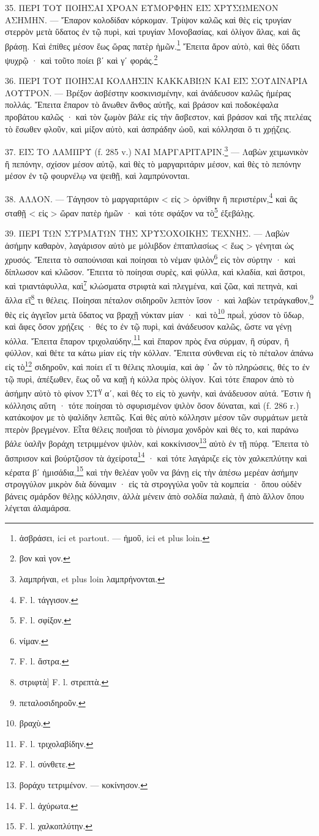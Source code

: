 \documentclass[a4paper, 11pt, oneside, polutonikogreek, french]{article}
\begin{document}
35. ΠΕΡΙ ΤΟΥ ΠΟΙΗΣΑΙ ΧΡΟΑΝ ΕΥΜΟΡΦΗΝ ΕΙΣ ΧΡΥΣΩΜΕΝΟΝ ΑΣΗΜΗΝ. --- Ἔπαρον κολοδίδαν κόρκομαν. Τρίψον καλῶς καὶ θὲς εἰς τρυγίαν στερρὸν μετὰ ὕδατος ἐν τῷ πυρὶ, καὶ τρυγίαν Μονοβασίας, καὶ ὀλίγον ἅλας, καὶ ἂς βράσῃ. Καὶ ἐπίθες μέσον ἕως ὥρας πατὲρ ἡμῶν.\footnote{ἀσβράσει, ici et partout. --- ἠμοῦ, ici et plus loin.} Ἔπειτα ἄρον αὐτὸ, καὶ θὲς ὕδατι ψυχρῷ · καὶ τοῦτο ποίει βʹ καὶ γʹ φοράς.\footnote{βον καὶ γον.}

36. ΠΕΡΙ ΤΟΥ ΠΟΙΗΣΑΙ ΚΟΛΛΗΣΙΝ ΚΑΚΚΑΒΙΩΝ ΚΑΙ ΕΙΣ ΣΟΥΛΙΝΑΡΙΑ ΛΟΥΤΡΟΝ. --- Βρέξον ἀσβέστην κοσκινισμένην, καὶ ἀνάδευσον καλῶς ἡμέρας πολλάς. Ἔπειτα ἔπαρον τὸ ἄνωθεν ἄνθος αὐτῆς, καὶ βράσον καὶ ποδοκέφαλα προβάτου καλῶς · καὶ τὸν ζωμὸν βάλε εἰς τὴν ἄσβεστον, καὶ βράσον καὶ τῆς πτελέας τὸ ἔσωθεν φλοῦν, καὶ μίξον αὐτὸ, καὶ ἀσπράδην ὠοῦ, καὶ κόλλησαι ὅ τι χρῄζεις.

37. ΕΙΣ ΤΟ ΛΑΜΠΡΥ (f. 285 v.) ΝΑΙ ΜΑΡΓΑΡΙΤΑΡΙΝ.\footnote{λαμπρήναι, et plus loin λαμπρήνονται.} --- Λαβὼν χειμωνικὸν ἢ πεπόνην, σχίσον μέσον αὐτῷ, καὶ θὲς τὸ μαργαριτάριν μέσον, καὶ θὲς τὸ πεπόνην μέσον ἐν τῷ φουρνέλῳ να ψειθῇ, καὶ λαμπρύνονται.

38. ΑΛΛΟΝ. --- Τάγησον τὸ μαργαριτάριν < εἰς > ὀρνίθην ἢ περιστέριν,\footnote{F. l. τάγγισον.} καὶ ἂς σταθῇ < εἰς > ὥραν πατὲρ ἡμῶν · καὶ τότε σφάξον να τὸ\footnote{F. l. σφίξον.} ἐξεβάλῃς.

39. ΠΕΡΙ ΤΩΝ ΣΥΡΜΑΤΩΝ ΤΗΣ ΧΡΥΣΟΧΟΙΚΗΣ ΤΕΧΝΗΣ. --- Λαβὼν ἀσήμην καθαρὸν, λαγάρισον αὐτὸ με μόλιβδον ἐπταπλασίως < ἕως > γένηται ὠς χρυσός. Ἔπειτα τὸ σαπούνισαι καὶ ποίησαι τὸ νέμαν ψιλὸν\footnote{νίμαν.} εἰς τὸν σύρτην · καὶ δίπλωσον καὶ κλῶσον. Ἔπειτα τὸ ποίησαι συρὲς, καὶ φύλλα, καὶ κλαδία, καὶ ἄστροι, καὶ τριαντάφυλλα, καὶ\footnote{F. l. ἄστρα.} κλώσματα στριφτὰ καὶ πλεγμένα, καὶ ζῶα, καὶ πετηνὰ, καὶ ἄλλα εἴ\footnote{στριφτὰ] F. l. στρεπτὰ.} τι θέλεις. Ποίησαι πέταλον σιδηροῦν λεπτὸν ἵσον · καὶ λαβὼν τετράγκαθον,\footnote{πεταλοσιδηροῦν.} θὲς εἰς ἀγγεῖον μετὰ ὕδατος να βραχῇ νύκταν μίαν · καὶ τὸ\footnote{βραχὺ.} πρωῒ, χύσον τὸ ὕδωρ, καὶ ἄφες ὅσον χρῄζεις · θές το ἐν τῷ πυρὶ, καὶ ἀνάδευσον καλῶς, ὥστε να γένῃ κόλλα. Ἔπειτα ἔπαρον τριχολαύδην,\footnote{F. l. τριχολαβίδην.} καὶ ἔπαρον πρὸς ἕνα σύρμαν, ἢ σύραν, ἢ φύλλον, καὶ θέτε τα κάτω μίαν εἰς τὴν κόλλαν. Ἔπειτα σύνθεναι εἰς τὸ πέταλον ἀπάνω εἰς τὸ\footnote{F. l. σύνθετε.} σιδηροῦν, καὶ ποίει εἴ τι θέλεις πλουμία, καὶ ἀφ ᾽ ὧν τὸ πληρώσεις, θές το ἐν τῷ πυρὶ, ἀπέξωθεν, ἕως οὗ να καῇ ἡ κόλλα πρὸς ὀλίγον. Καὶ τότε ἔπαρον ἀπὸ τὸ ἀσήμην αὐτὸ τὸ φίνον ΣΤ\textsuperscript{γ} αʹ, καὶ θές το εἰς τὸ χωνὴν, καὶ ἀνάδευσον αὐτά. Ἔστιν ἡ κόλλησις αὕτη · τότε ποίησαι τὸ σφυρισμένον ψιλὸν ὅσον δύναται, καὶ (f. 286 r.) κατάκοψον με τὸ ψαλίδην λεπτῶς. Καὶ θὲς αὐτὸ κόλλησιν μέσον τῶν συρμάτων μετὰ πτερὸν βρεγμένον. Εἶτα θέλεις ποιῆσαι τὸ ῥίνισμα χονδρὸν καὶ θές το, καὶ παράνω βάλε ὑαλῆν βοράχη τετριμμένον ψιλὸν, καὶ κοκκίνισον\footnote{βοράχυ τετριμένον. --- κοκίνησον.} αὐτὸ ἐν τῇ πύρᾳ. Ἔπειτα τὸ ἄσπρισον καὶ βούρτζισον τὰ ἀχείροτα\footnote{F. l. ἀχύρωτα.} · καὶ τότε λαγάριζε εἰς τὸν χαλκεπλύτην καὶ κέρατα βʹ ἡμισάδια,\footnote{F. l. χαλκοπλύτην.} καὶ τὴν θελέαν γοῦν να βάνῃ εἰς τὴν ἀπέσω μερέαν ἀσήμην στρογγύλον μικρὸν διὰ δύναμιν · εἰς τὰ στρογγύλα γοῦν τὰ κομπεία · ὅπου οὐδὲν βάνεις σμάρδον θέλῃς κόλλησιν, ἀλλὰ μένειν ἀπὸ σολδία παλαιὰ, ἢ ἀπὸ ἄλλον ὅπου λέγεται ἀλαμάρσα.
\end{document}
